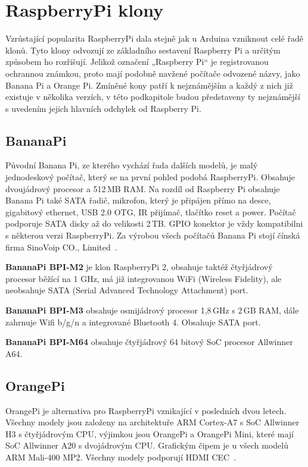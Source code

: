 \section{RaspberryPi klony}
\label{KapRaspiKlony}

Vzrůstající popularita RaspberryPi dala stejně jak u Arduina vzniknout celé řadě klonů. Tyto klony odvozují ze základního sestavení Raspberry Pi a určitým způsobem ho rozřišují. Jelikož označení „Raspberry Pi“ je registrovanou ochrannou známkou, proto mají podobně navžené počítače odvozené názvy, jako Banana Pi a Orange Pi. Zmíněné kony patří k nejznámějším a každý z nich již existuje v několika verzích, v této podkapitole budou představeny ty nejznámější s uvedením jejich hlavních odchylek od Raspberry Pi.

	\subsection{BananaPi}
		Původní Banana Pi, ze kterého vychází řada dalších modelů, je malý jednodeskový počítač, který se na první pohled podobá RaspberryPi.  Obsahuje dvoujádrový procesor a 512\,MB RAM. Na rozdíl od Raspberry Pi obsahuje Banana Pi také SATA řadič, mikrofon, který je připájen přímo na desce, gigabitový ethernet, USB 2.0 OTG, IR přijímač, tlačítko reset a power. Počítač podporuje SATA disky až do velikosti 2\,TB. GPIO konektor je vždy kompatibilni s některou verzi RaspberryPi. Za výrobou všech počítačů Banana Pi stojí čínská firma SinoVoip CO., Limited~\cite{BananaPi}.
		
	\textbf{BananaPi BPI-M2} je klon RaspberryPi 2, obsahuje taktéž čtyřjádrový procesor běžící na 1 GHz, má již integrovanou WiFi (Wireless Fidelity), ale neobsahuje SATA (Serial Advanced Technology Attachment) port.
	
	\textbf{BananaPi BPI-M3} obsahuje osmijádrový procesor 1,8\,GHz s 2\,GB RAM, dále zahrnuje Wifi b/g/n a integrované Bluetooth 4. Obsahuje SATA port.
	
	\textbf{BananaPi BPI-M64} obsahuje čtyřjádrový 64 bitový SoC procesor Allwinner A64.

	\subsection{OrangePi}
	OrangePi je alternativa pro RaspberryPi vznikající v posledních dvou letech. Všechny modely jsou založeny na architektuře ARM Cortex-A7 s SoC Allwinner H3 s čtyřjádrovým CPU, výjimkou jsou OrangePi a OrangePi Mini, které mají SoC Allwinner A20 s dvojádrovým CPU. Grafickým čipem je u všech modelů ARM Mali-400 MP2. Všechny modely podporují HDMI CEC~\cite{OrangePi}.

